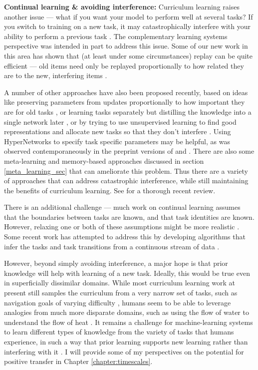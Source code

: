 \textbf{Continual learning \& avoiding interference:} Curriculum learning raises another issue --- what if you want your model to perform well at several tasks? If you switch to training on a new task, it may catastrophically interfere with your ability to perform a previous task \citep{McCloskey1989}. The complementary learning systems perspective \citep{McClelland1995, Kumaran2016} was intended in part to address this issue. Some of our new work in this area has shown that (at least under some circumstances) replay can be quite efficient --- old items need only be replayed proportionally to how related they are to the new, interfering items \citep{McClelland2020}. \par
A number of other approaches have also been proposed recently, based on ideas like preserving parameters from updates proportionally to how important they are for old tasks \citep{Kirkpatrick2016, Zenke2017}, or learning tasks separately but distilling the knowledge into a single network later \citep{Rusu2015}, or by trying to use unsupervised learning to find good representations and allocate new tasks so that they don't interfere \citep{Achille2018a, Rao2019}. Using HyperNetworks \citep{Ha2016} to specify task specific parameters may be helpful, as was observed contemporaneously in the preprint versions of \citet{Lampinen2019a} and \citet{Oswald2020}. There are also some meta-learning and memory-based approaches discussed in section \ref{meta_learning_sec} that can ameliorate this problem. Thus there are a variety of approaches that can address catastrophic interference, while still maintaining the benefits of curriculum learning. See \citet{Parisi2019} for a thorough recent review. \par
There is an additional challenge --- much work on continual learning assumes that the boundaries between tasks are known, and that task identities are known. However, relaxing one or both of these assumptions might be more realistic \citep{Ven2018}. Some recent work has attempted to address this by developing algorithms that infer the tasks and task transitions from a continuous stream of data \citep{Nagabandi2019}. \par
However, beyond simply avoiding interference, a major hope is that prior knowledge will help with learning of a new task. Ideally, this would be true even in superficially dissimilar domains. While most curriculum learning work at present still samples the curriculum from a very narrow set of tasks, such as navigation goals of varying difficulty \citep{Florensa2018}, humans seem to be able to leverage analogies from much more disparate domains, such as using the flow of water to understand the flow of heat \citep[see][]{Falkenhainer1989}. It remains a challenge for machine-learning systems to learn different types of knowledge from the variety of tasks that humans experience, in such a way that prior learning supports new learning rather than interfering with it \citep{Mitchell2018}. I will provide some of my perspectives on the potential for positive transfer in Chapter \ref{chapter:timescales}. \par 

